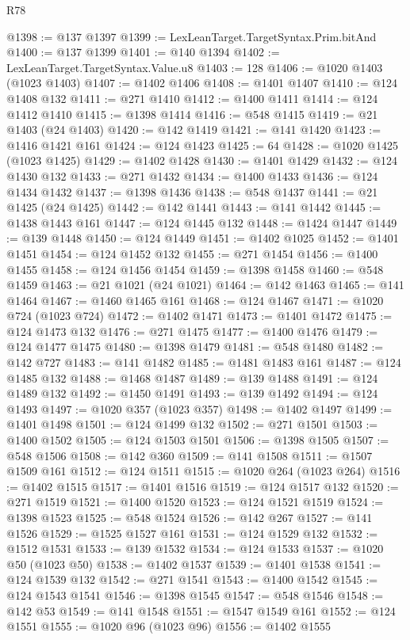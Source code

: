 \begin{lexlean}{R78}
\begin{coremodule}
@1398 := @137 @1397
@1399 := LexLeanTarget.TargetSyntax.Prim.bitAnd
@1400 := @137 @1399
@1401 := @140 @1394
@1402 := LexLeanTarget.TargetSyntax.Value.u8
@1403 := 128
@1406 := @1020 @1403 (@1023 @1403)
@1407 := @1402 @1406
@1408 := @1401 @1407
@1410 := @124 @1408 @132
@1411 := @271 @1410
@1412 := @1400 @1411
@1414 := @124 @1412 @1410
@1415 := @1398 @1414
@1416 := @548 @1415
@1419 := @21 @1403 (@24 @1403)
@1420 := @142 @1419
@1421 := @141 @1420
@1423 := @1416 @1421 @161
@1424 := @124 @1423
@1425 := 64
@1428 := @1020 @1425 (@1023 @1425)
@1429 := @1402 @1428
@1430 := @1401 @1429
@1432 := @124 @1430 @132
@1433 := @271 @1432
@1434 := @1400 @1433
@1436 := @124 @1434 @1432
@1437 := @1398 @1436
@1438 := @548 @1437
@1441 := @21 @1425 (@24 @1425)
@1442 := @142 @1441
@1443 := @141 @1442
@1445 := @1438 @1443 @161
@1447 := @124 @1445 @132
@1448 := @1424 @1447
@1449 := @139 @1448
@1450 := @124 @1449
@1451 := @1402 @1025
@1452 := @1401 @1451
@1454 := @124 @1452 @132
@1455 := @271 @1454
@1456 := @1400 @1455
@1458 := @124 @1456 @1454
@1459 := @1398 @1458
@1460 := @548 @1459
@1463 := @21 @1021 (@24 @1021)
@1464 := @142 @1463
@1465 := @141 @1464
@1467 := @1460 @1465 @161
@1468 := @124 @1467
@1471 := @1020 @724 (@1023 @724)
@1472 := @1402 @1471
@1473 := @1401 @1472
@1475 := @124 @1473 @132
@1476 := @271 @1475
@1477 := @1400 @1476
@1479 := @124 @1477 @1475
@1480 := @1398 @1479
@1481 := @548 @1480
@1482 := @142 @727
@1483 := @141 @1482
@1485 := @1481 @1483 @161
@1487 := @124 @1485 @132
@1488 := @1468 @1487
@1489 := @139 @1488
@1491 := @124 @1489 @132
@1492 := @1450 @1491
@1493 := @139 @1492
@1494 := @124 @1493
@1497 := @1020 @357 (@1023 @357)
@1498 := @1402 @1497
@1499 := @1401 @1498
@1501 := @124 @1499 @132
@1502 := @271 @1501
@1503 := @1400 @1502
@1505 := @124 @1503 @1501
@1506 := @1398 @1505
@1507 := @548 @1506
@1508 := @142 @360
@1509 := @141 @1508
@1511 := @1507 @1509 @161
@1512 := @124 @1511
@1515 := @1020 @264 (@1023 @264)
@1516 := @1402 @1515
@1517 := @1401 @1516
@1519 := @124 @1517 @132
@1520 := @271 @1519
@1521 := @1400 @1520
@1523 := @124 @1521 @1519
@1524 := @1398 @1523
@1525 := @548 @1524
@1526 := @142 @267
@1527 := @141 @1526
@1529 := @1525 @1527 @161
@1531 := @124 @1529 @132
@1532 := @1512 @1531
@1533 := @139 @1532
@1534 := @124 @1533
@1537 := @1020 @50 (@1023 @50)
@1538 := @1402 @1537
@1539 := @1401 @1538
@1541 := @124 @1539 @132
@1542 := @271 @1541
@1543 := @1400 @1542
@1545 := @124 @1543 @1541
@1546 := @1398 @1545
@1547 := @548 @1546
@1548 := @142 @53
@1549 := @141 @1548
@1551 := @1547 @1549 @161
@1552 := @124 @1551
@1555 := @1020 @96 (@1023 @96)
@1556 := @1402 @1555

\end{coremodule}
\end{lexlean}
